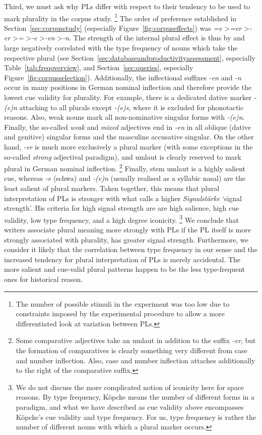 Third, we must ask why PLs differ with respect to their tendency to be used to mark plurality in the corpus study.%
\footnote{The number of possible stimuli in the experiment was too low due to constraints imposed by the experimental procedure to allow a more differentiated look at variation between PLs.}
The order of preference established in Section~\ref{sec:corpusstudy} (especially Figure~\ref{fig:corpuseffects}) was \textit{=e} \textgreater \textit{=er} \textgreater \textit{-er} \textgreater \textit{=} \textgreater \textit{-e} \textgreater \textit{-en} \textgreater \textit{-n}.
The strength of the internal plural effect is thus by and large negatively correlated with the type frequency of nouns which take the respective plural (see Section~\ref{sec:databaseandproductivityassessment}, especially Table~\ref{tab:freqoverview}, and Section~\ref{sec:queries}, especially Figure~\ref{fig:corpusselection}).
Additionally, the inflectional suffixes \textit{-en} and \textit{-n} occur in many positions in German nominal inflection and therefore provide the lowest cue validity for plurality.
For example, there is a dedicated dative marker \textit{-(e)n} attaching to all plurals except \textit{-(e)s}, where it is excluded for phonotactic reasons.
Also, weak nouns mark all non-nominative singular forms with \textit{-(e)n}.
Finally, the so-called \textit{weak} and \textit{mixed} adjectives end in \textit{-en} in all oblique (dative and genitive) singular forms and the masculine accusative singular.
On the other hand, \textit{-er} is much more exclusively a plural marker (with some exceptions in the so-called \textit{strong} adjectival paradigm), and umlaut is clearly reserved to mark plural in German nominal inflection.%
\footnote{Some comparative adjectives take an umlaut in addition to the suffix \textit{-er}, but the formation of comparatives is clearly something very different from case and number inflection.
Also, case and number inflection attaches additionally to the right of the comparative suffix.}
Finally, stem umlaut is a highly salient cue, whereas \textit{-e} (schwa) and \textit{-(e)n} (usually realised as a syllabic nasal) are the least salient of plural markers.
Taken together, this means that plural interpretation of PLs is stronger with what \textcite{Koepcke1993} calls a higher \textit{Signalstärke} `signal strength'.
His criteria for high signal strength are are high salience, high cue validity, low type frequency, and a high degree  iconicity.%
\footnote{We do not discuss the more complicated notion of iconicity here for space reasons.
By type frequency, Köpcke means the number of different forms in a paradigm, and what we have described as cue validity above encompasses Köpcke's cue validity and type frequency.
For us, type frequency is rather the number of different nouns with which a plural marker occurs.}
We conclude that writers associate plural meaning more strongly with PLs if the PL itself is more strongly associated with plurality, \ie has greater signal strength.
Furthermore, we consider it likely that the correlation between type frequency in our sense and the increased tendency for plural interpretation of PLs is merely accidental.
The more salient and cue-valid plural patterns happen to be the less type-frequent ones for historical reason.

